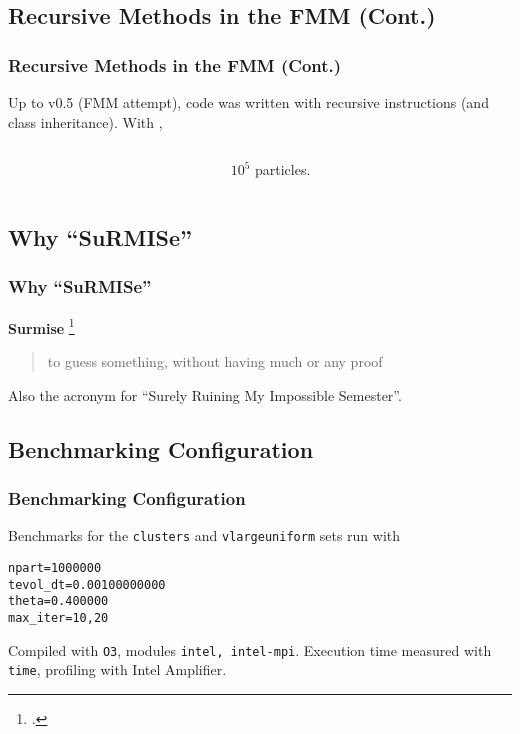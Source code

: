 \begin{frame}[t]
	\section{Recursive Methods in the FMM (Cont.)}
	\frametitle{Recursive Methods in the FMM (Cont.)}
	Up to v0.5 (FMM attempt), code was written with recursive instructions (and class inheritance). With \only<2>{\lstinline|O3|},
	\begin{columns}
		\begin{column}{0.7\textwidth}
			\only<1>{}
			\only<2>{}
		\end{column}
		\begin{column}{0.3\textwidth}
			$10^5$ particles.
			
			
		\end{column}
	\end{columns}
\end{frame}

\begin{frame}
	\section{Why ``SuRMISe''}
	\frametitle{Why ``SuRMISe''}
	\textbf{Surmise} \footcite{surmise}
	\begin{quote}
		to guess something, without having much or any proof
	\end{quote}
	\par
	\vspace{1cm}
	Also the acronym for ``\alert{Su}rely \alert{R}uining \alert{M}y \alert{I}mpossible \alert{Se}mester''.
\end{frame}

\begin{frame}[fragile]
	\section{Benchmarking Configuration}
	\frametitle{Benchmarking Configuration}
	Benchmarks for the \lstinline|clusters| and \lstinline|vlargeuniform| sets run with
\begin{lstlisting}
npart=1000000
tevol_dt=0.00100000000
theta=0.400000
max_iter=10,20
\end{lstlisting}
	Compiled with \lstinline|O3|, modules \lstinline|intel, intel-mpi|. Execution time measured with \lstinline|time|, profiling with Intel Amplifier.
\end{frame}

